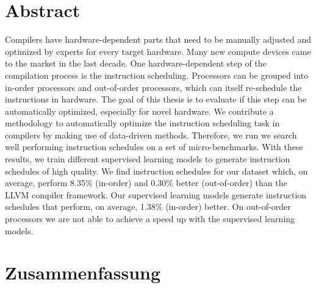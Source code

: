 \chapter*{Abstract}
Compilers have hardware-dependent parts that need to be manually adjusted and optimized by experts for every target hardware.
Many new compute devices came to the market in the last decade.
One hardware-dependent step of the compilation process is the instruction scheduling.
Processors can be grouped into in-order processors and out-of-order processors, which can itself re-schedule the instructions in hardware.
The goal of this thesis is to evaluate if this step can be automatically optimized, especially for novel hardware.
We contribute a methodology to automatically optimize the instruction scheduling task in compilers by making use of data-driven methods.
Therefore, we run we search well performing instruction schedules on a set of micro-benchmarks.
With these results, we train different supervised learning models to generate instruction schedules of high quality.
We find instruction schedules for our dataset which, on average, perform 8.35\% (in-order) and 0.30\% better (out-of-order) than the LLVM compiler framework.
Our supervised learning models generate instruction schedules that perform, on average, 1.38\% (in-order) better.
On out-of-order processors we are not able to achieve a speed up with the supervised learning models.

\chapter*{Zusammenfassung}
